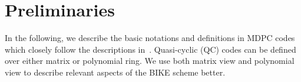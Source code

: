 \documentclass[runningheads]{llncs}
\begin{document}
\section{Preliminaries}
\label{sec::prelim}

In the following, we describe the basic notations and definitions
in MDPC codes which closely follow the descriptions in~\cite{aragon2017bike}. Quasi-cyclic (QC) codes can be  defined  over either matrix or polynomial ring. 
We use both matrix view and polynomial view to  describe relevant aspects of the BIKE
scheme better.


\newcommand{\tabincell}[2]{\begin{tabular}{@{}#1@{}}#2\end{tabular}}
\end{document}
